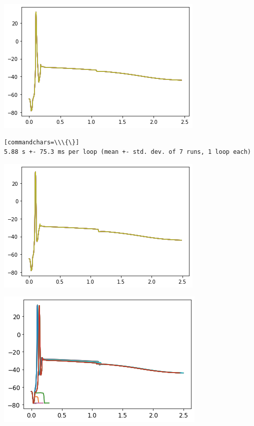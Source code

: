     \begin{center}
    \includegraphics[width=0.7\linewidth]{figures/NU_BBP_fusion_L5PC_files/NU_BBP_fusion_L5PC_4_3.png}
    \end{center}

    \begin{verbatim}[commandchars=\\\{\}]
5.88 s +- 75.3 ms per loop (mean +- std. dev. of 7 runs, 1 loop each)
    \end{verbatim}

    \begin{center}
    \includegraphics[width=0.7\linewidth]{figures/NU_BBP_fusion_L5PC_files/NU_BBP_fusion_L5PC_4_5.png}
    \end{center}

    \begin{center}
    \includegraphics[width=0.7\linewidth]{figures/NU_BBP_fusion_L5PC_files/NU_BBP_fusion_L5PC_6_0.png}
    \end{center}

